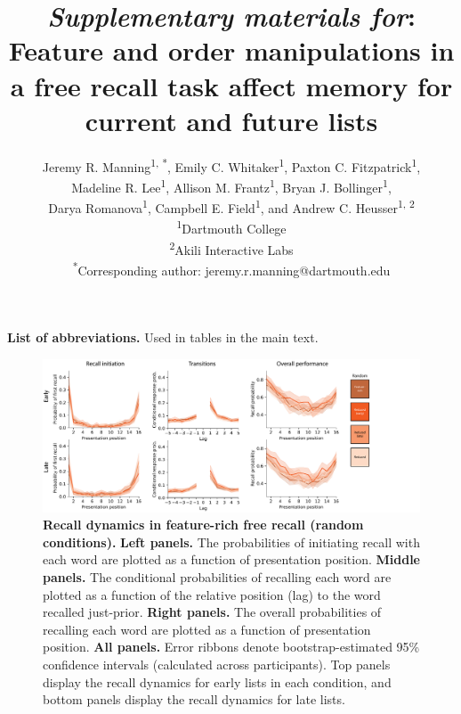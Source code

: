\documentclass{article}
\title{\textit{Supplementary materials for}: Feature and order manipulations in
a free recall task affect memory for current and future lists}
\author{Jeremy R. Manning\textsuperscript{1, *}, Emily C.
Whitaker\textsuperscript{1}, Paxton C. Fitzpatrick\textsuperscript{1},
\\Madeline R. Lee\textsuperscript{1}, Allison M. Frantz\textsuperscript{1},
Bryan J. Bollinger\textsuperscript{1},\\Darya Romanova\textsuperscript{1},
Campbell E. Field\textsuperscript{1}, and Andrew C. Heusser\textsuperscript{1,
2}\\\textsuperscript{1}Dartmouth College\\\textsuperscript{2}Akili
Interactive Labs\\\textsuperscript{*}Corresponding author:
jeremy.r.manning@dartmouth.edu}
\date{}
\begin{document}


\setcounter{equation}{0}
\setcounter{figure}{0}
\setcounter{table}{0}
\setcounter{page}{1}
\setcounter{section}{0}
\makeatletter
\renewcommand{\theequation}{S\arabic{equation}}
\renewcommand{\thefigure}{S\arabic{figure}}
\renewcommand{\thetable}{S\arabic{table}}
\renewcommand{\bibnumfmt}[1]{[S#1]}
\renewcommand{\citenumfont}[1]{S#1}

\maketitle

\begin{table}[p]
    \centering
    
    
    \caption{\textbf{List of abbreviations.} Used in tables in the main text.}
    
    \label{tab:abbreviations}
\end{table}

\begin{figure}[p] \centering
\includegraphics[width=\textwidth]{figures/recall_dynamics_random}

\caption{\textbf{Recall dynamics in feature-rich free recall (random
conditions).} \textbf{Left panels.} The probabilities of initiating recall with
each word are plotted as a function of presentation position. \textbf{Middle
panels.} The conditional probabilities of recalling each word are plotted as a
function of the relative position (lag) to the word recalled just-prior.
\textbf{Right panels.} The overall probabilities of recalling each word are
plotted as a function of presentation position. \textbf{All panels.} Error
ribbons denote bootstrap-estimated 95\% confidence intervals (calculated across
participants). Top panels display the recall dynamics for early lists in each
condition, and bottom panels display the recall dynamics for late lists.}

    \label{fig:recall-dynamics-random}
\end{figure}
\end{document}

